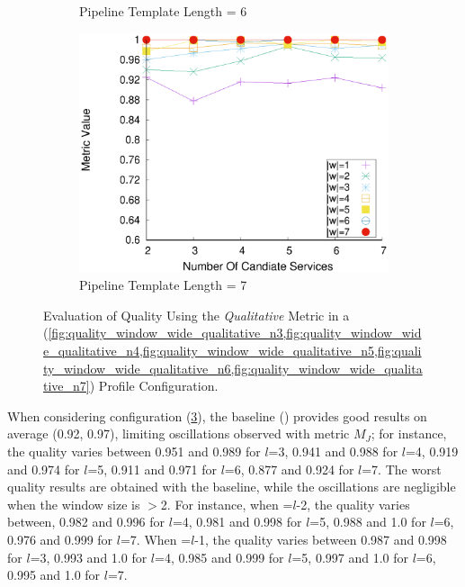 \begin{figure}[ht!]
\begin{subfigure}{0.49\textwidth}
        \caption{Pipeline Template Length = 6}
        \label{fig:quality_window_wide_qualitative_n6}
      \end{subfigure}
      \hfill
      \begin{subfigure}{0.49\textwidth}
        \includegraphics[width=\textwidth]{Images/graphs/window_quality_performance_diff_qual_n7_s7_20_100_n7}
        \caption{Pipeline Template Length = 7}
        \label{fig:quality_window_wide_qualitative_n7}
      \end{subfigure}


      \caption{Evaluation of Quality Using the \emph{Qualitative} Metric in a \wide (\cref{fig:quality_window_wide_qualitative_n3,fig:quality_window_wide_qualitative_n4,fig:quality_window_wide_qualitative_n5,fig:quality_window_wide_qualitative_n6,fig:quality_window_wide_qualitative_n7}) Profile Configuration.}  \label{fig:quality_window_qualitative_wide}
    \end{figure}

    When considering configuration \wide (\cref{fig:quality_window_qualitative_wide}), the baseline () provides good results on average (0.92, 0.97), limiting oscillations observed with metric $M_J$; for instance, the quality varies between 0.951 and 0.989 for $l$=3, 0.941 and 0.988 for $l$=4, 0.919 and 0.974 for $l$=5, 0.911 and 0.971 for $l$=6, 0.877 and 0.924 for $l$=7.
    The worst quality results are obtained with the baseline, while the oscillations are negligible when the window size is $>$2. For instance, when \windowsize=$l$-2, the quality varies between, 0.982 and 0.996 for $l$=4, 0.981 and 0.998 for $l$=5, 0.988 and 1.0 for $l$=6, 0.976 and 0.999 for $l$=7. When \windowsize=$l$-1, the quality varies between  0.987 and  0.998 for $l$=3, 0.993 and 1.0 for $l$=4, 0.985 and 0.999 for $l$=5, 0.997 and 1.0 for $l$=6, 0.995 and 1.0  for $l$=7.


